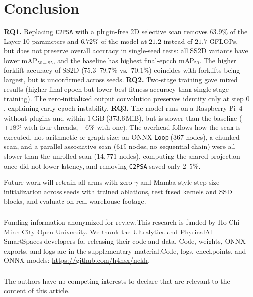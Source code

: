 \section{Conclusion}
\label{sec:conclusion}
\textbf{RQ1.} Replacing \texttt{C2PSA} with a plugin-free 2D selective scan removes $63.9\%$ of the Layer-10 parameters and $6.72\%$ of the model at $21.2$ instead of $21.7$ GFLOPs, but does not preserve overall accuracy in single-seed tests: all SS2D variants have lower $\text{mAP}_{50-95}$, and the baseline has highest final-epoch $\text{mAP}_{50}$. The higher forklift accuracy of SS2D ($75.3$--$79.7\%$ vs.\ $70.1\%$) coincides with forklifts being largest, but is unconfirmed across seeds. \textbf{RQ2.} Two-stage training gave mixed results (higher final-epoch but lower best-fitness accuracy than single-stage training). The zero-initialized output convolution preserves identity only at step $0$, explaining early-epoch instability. \textbf{RQ3.} The model runs on a Raspberry Pi~4 without plugins and within $1$\,GiB ($373.6$\,MiB), but is slower than the baseline ($+18\%$ with four threads, $+6\%$ with one). The overhead follows how the scan is executed, not arithmetic or graph size: an ONNX \texttt{Loop} ($367$ nodes), a chunked scan, and a parallel associative scan ($619$ nodes, no sequential chain) were all slower than the unrolled scan ($14{,}771$ nodes), computing the shared projection once did not lower latency, and removing \texttt{C2PSA} saved only $2$--$5\%$.

Future work will retrain all arms with zero-$\gamma$ and Mamba-style step-size initialization across seeds with trained ablations, test fused kernels and SSD blocks, and evaluate on real warehouse footage.

\begin{credits}
\subsubsection{\ackname} \ifanonymous Funding information anonymized for review.\else This research is funded by Ho Chi Minh City Open University.\fi{} We thank the Ultralytics and PhysicalAI-SmartSpaces developers for releasing their code and data. \ifanonymous Code, weights, ONNX exports, and logs are in the supplementary material.\else Code, logs, checkpoints, and ONNX models: \url{https://github.com/h4nsx/nckh}.\fi

\subsubsection{\discintname} The authors have no competing interests to declare that are relevant to the content of this article.
\end{credits}
